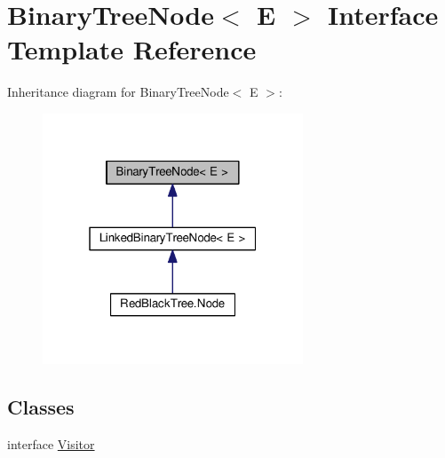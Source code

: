 \hypertarget{interface_binary_tree_node}{}\section{Binary\+Tree\+Node$<$ E $>$ Interface Template Reference}
\label{interface_binary_tree_node}


Inheritance diagram for Binary\+Tree\+Node$<$ E $>$\+:
\nopagebreak
\begin{figure}[H]
\begin{center}
\leavevmode
\includegraphics[width=220pt]{interface_binary_tree_node__inherit__graph}
\end{center}
\end{figure}
\subsection*{Classes}
\begin{DoxyCompactItemize}
\item 
interface \hyperlink{interface_binary_tree_node_1_1_visitor}{Visitor}
\end{DoxyCompactItemize}
